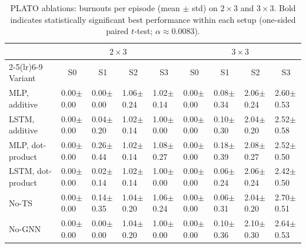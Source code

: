 \begin{table}[h]
\centering
\small
\setlength{\tabcolsep}{1.4pt}
\renewcommand{\arraystretch}{1.02}
\begin{tabular}{@{\hspace{2pt}}l|l|l|l|l||l|l|l|l@{\hspace{2pt}}}
\toprule
& \multicolumn{4}{c||}{$2\times 3$} & \multicolumn{4}{c}{$3\times 3$} \\
\cmidrule(lr){2-5}\cmidrule(lr){6-9}
Variant & \multicolumn{1}{c|}{S0} & \multicolumn{1}{c|}{S1} & \multicolumn{1}{c|}{S2} & \multicolumn{1}{c||}{S3}
        & \multicolumn{1}{c|}{S0} & \multicolumn{1}{c|}{S1} & \multicolumn{1}{c|}{S2} & \multicolumn{1}{c}{S3} \\
\midrule
MLP, additive      & 0.00$\pm$0.00 & 0.00$\pm$0.00 & 1.06$\pm$0.24 & 1.02$\pm$0.14
                  & 0.00$\pm$0.00 & 0.08$\pm$0.34 & 2.06$\pm$0.24 & 2.60$\pm$0.53 \\
LSTM, additive     & 0.00$\pm$0.00 & 0.04$\pm$0.20 & 1.02$\pm$0.14 & 1.00$\pm$0.00
                  & 0.00$\pm$0.00 & 0.10$\pm$0.30 & 2.04$\pm$0.20 & 2.52$\pm$0.58 \\
MLP, dot-product   & 0.00$\pm$0.00 & 0.26$\pm$0.44 & 1.02$\pm$0.14 & 1.08$\pm$0.27
                  & 0.00$\pm$0.00 & 0.18$\pm$0.39 & 2.08$\pm$0.27 & 2.52$\pm$0.50 \\
LSTM, dot-product  & 0.00$\pm$0.00 & 0.02$\pm$0.14 & 1.02$\pm$0.14 & 1.00$\pm$0.00
                  & 0.00$\pm$0.00 & 0.06$\pm$0.24 & 2.06$\pm$0.24 & 2.42$\pm$0.50 \\
No-TS              & 0.00$\pm$0.00 & 0.14$\pm$0.35 & 1.04$\pm$0.20 & 1.06$\pm$0.24
                  & 0.00$\pm$0.00 & 0.06$\pm$0.31 & 2.04$\pm$0.20 & 2.70$\pm$0.51 \\
No-GNN             & 0.00$\pm$0.00 & 0.00$\pm$0.00 & 1.04$\pm$0.20 & 1.00$\pm$0.00
                  & 0.00$\pm$0.00 & 0.10$\pm$0.36 & 2.10$\pm$0.30 & 2.64$\pm$0.53 \\
\bottomrule
\end{tabular}
\caption{PLATO ablations: burnouts per episode (mean $\pm$ std) on $2\times 3$ and $3\times 3$. Bold indicates statistically significant best performance within each setup (one-sided paired $t$-test; $\alpha\approx0.0083$).}
\label{tab:ablate_burnouts_2x3_3x3}
\end{table}


